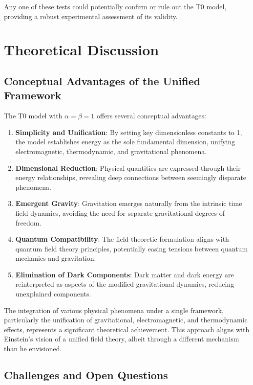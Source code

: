 \documentclass[12pt,a4paper]{article} %
\begin{document}
	Any one of these tests could potentially confirm or rule out the T0 model,
	providing a robust experimental assessment of its validity.
	
	\section{Theoretical Discussion}
	\label{sec:theory_disc}
	
	\subsection{Conceptual Advantages of the Unified Framework}
	\label{subsec:advantages}
	
	The T0 model with $\alpha = \beta = 1$ offers several conceptual advantages:
	\begin{enumerate}
		\item \textbf{Simplicity and Unification}:
		By setting key dimensionless constants to 1,
		the model establishes energy as the sole fundamental dimension,
		unifying electromagnetic, thermodynamic, and gravitational phenomena.
		\item \textbf{Dimensional Reduction}:
		Physical quantities are expressed through their energy relationships,
		revealing deep connections between seemingly disparate phenomena.
		\item \textbf{Emergent Gravity}:
		Gravitation emerges naturally from the intrinsic time field dynamics,
		avoiding the need for separate gravitational degrees of freedom.
		\item \textbf{Quantum Compatibility}:
		The field-theoretic formulation aligns with quantum field theory principles,
		potentially easing tensions between quantum mechanics and gravitation.
		\item \textbf{Elimination of Dark Components}:
		Dark matter and dark energy are reinterpreted
		as aspects of the modified gravitational dynamics,
		reducing unexplained components.
	\end{enumerate}
	
	The integration of various physical phenomena under a single framework,
	particularly the unification of gravitational, electromagnetic, and thermodynamic effects,
	represents a significant theoretical achievement. 
	This approach aligns with Einstein's vision of a unified field theory,
	albeit through a different mechanism than he envisioned.
	
	\subsection{Challenges and Open Questions}
	\label{subsec:challenges}
	
\end{document}
